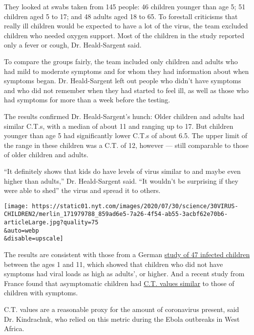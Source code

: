 They looked at swabs taken from 145 people: 46 children younger than age
5; 51 children aged 5 to 17; and 48 adults aged 18 to 65. To forestall
criticisms that really ill children would be expected to have a lot of
the virus, the team excluded children who needed oxygen support. Most of
the children in the study reported only a fever or cough, Dr.
Heald-Sargent said.

To compare the groups fairly, the team included only children and adults
who had mild to moderate symptoms and for whom they had information
about when symptoms began. Dr. Heald-Sargent left out people who didn't
have symptoms and who did not remember when they had started to feel
ill, as well as those who had symptoms for more than a week before the
testing.

The results confirmed Dr. Heald-Sargent's hunch: Older children and
adults had similar C.T.s, with a median of about 11 and ranging up to
17. But children younger than age 5 had significantly lower C.T.s of
about 6.5. The upper limit of the range in these children was a C.T. of
12, however --- still comparable to those of older children and adults.

``It definitely shows that kids do have levels of virus similar to and
maybe even higher than adults,'' Dr. Heald-Sargent said. ``It wouldn't
be surprising if they were able to shed'' the virus and spread it to
others.

\texttt{[image: https://static01.nyt.com/images/2020/07/30/science/30VIRUS-CHILDREN2/merlin\_171979788\_859ad6e5-7a26-4f54-ab55-3acbf62e70b6-articleLarge.jpg?quality=75\\\&auto=webp\\\&disable=upscale]}

The results are consistent with those from a German
\href{https://www.nytimes.com/2020/05/05/health/coronavirus-children-transmission-school.html}{study
of 47 infected children} between the ages 1 and 11, which showed that
children who did not have symptoms had viral loads as high as adults',
or higher. And a recent study from France found that asymptomatic
children had
\href{https://academic.oup.com/cid/article/doi/10.1093/cid/ciaa1044/5876373}{C.T.
values similar} to those of children with symptoms.

C.T. values are a reasonable proxy for the amount of coronavirus
present, said Dr. Kindrachuk, who relied on this metric during the Ebola
outbreaks in West Africa.

\href{https://www.nytimes.com/news-event/coronavirus?action=click\&pgtype=Article\&state=default\&region=MAIN_CONTENT_3\&context=storylines_faq}{}

